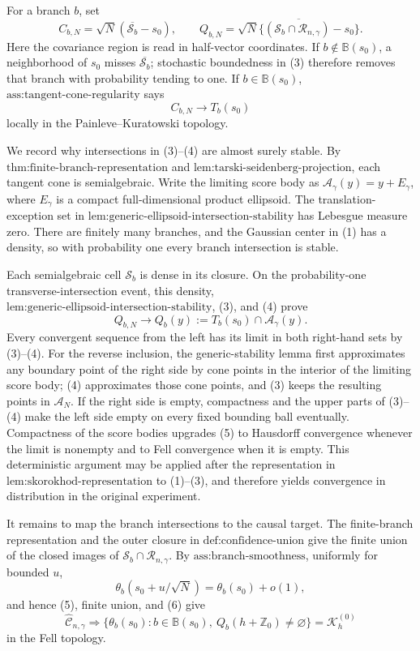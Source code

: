 For a branch \(b\), set
\[
 C_{b,N}=\sqrt N(\overline{\mathcal S_b}-s_0),\qquad
 Q_{b,N}=\overline{\sqrt N\{(\mathcal S_b\cap\mathcal R_{n,\gamma})-s_0\}}.
\]
Here the covariance region is read in half-vector coordinates.  If \(b\notin\mathbb B(s_0)\), a neighborhood of \(s_0\) misses \(\overline{\mathcal S_b}\); stochastic boundedness in (3) therefore removes that branch with probability tending to one.  If \(b\in\mathbb B(s_0)\), \(\text{ass:tangent-cone-regularity}\) says
\[
 C_{b,N}\longrightarrow T_b(s_0)
 \tag{4}
\]
locally in the Painleve--Kuratowski topology.

We record why intersections in (3)--(4) are almost surely stable.  By \(\text{thm:finite-branch-representation}\) and \(\text{lem:tarski-seidenberg-projection}\), each tangent cone is semialgebraic.  Write the limiting score body as \(\mathcal A_\gamma(y)=y+E_\gamma\), where \(E_\gamma\) is a compact full-dimensional product ellipsoid.  The translation-exception set in \(\text{lem:generic-ellipsoid-intersection-stability}\) has Lebesgue measure zero.  There are finitely many branches, and the Gaussian center in (1) has a density, so with probability one every branch intersection is stable.

Each semialgebraic cell \(\mathcal S_b\) is dense in its closure.  On the probability-one transverse-intersection event, this density, \(\text{lem:generic-ellipsoid-intersection-stability}\), (3), and (4) prove
\[
 Q_{b,N}
 \longrightarrow
 Q_b(y):=T_b(s_0)\cap\mathcal A_\gamma(y).
 \tag{5}
\]
Every convergent sequence from the left has its limit in both right-hand sets by (3)--(4).  For the reverse inclusion, the generic-stability lemma first approximates any boundary point of the right side by cone points in the interior of the limiting score body; (4) approximates those cone points, and (3) keeps the resulting points in \(\mathcal A_N\).  If the right side is empty, compactness and the upper parts of (3)--(4) make the left side empty on every fixed bounding ball eventually.  Compactness of the score bodies upgrades (5) to Hausdorff convergence whenever the limit is nonempty and to Fell convergence when it is empty.  This deterministic argument may be applied after the representation in \(\text{lem:skorokhod-representation}\) to (1)--(3), and therefore yields convergence in distribution in the original experiment.

It remains to map the branch intersections to the causal target.  The finite-branch representation and the outer closure in \(\text{def:confidence-union}\) give the finite union of the closed images of \(\mathcal S_b\cap\mathcal R_{n,\gamma}\).  By \(\text{ass:branch-smoothness}\), uniformly for bounded \(u\),
\[
 \theta_b(s_0+u/\sqrt N)=\theta_b(s_0)+o(1),
 \tag{6}
\]
and hence (5), finite union, and (6) give
\[
 \widehat{\mathcal C}_{n,\gamma}
 \Rightarrow
 \{\theta_b(s_0):b\in\mathbb B(s_0),\ Q_b(h+\mathbb Z_0)\ne\varnothing\}
 =\mathcal K_h^{(0)}
\]
in the Fell topology.

